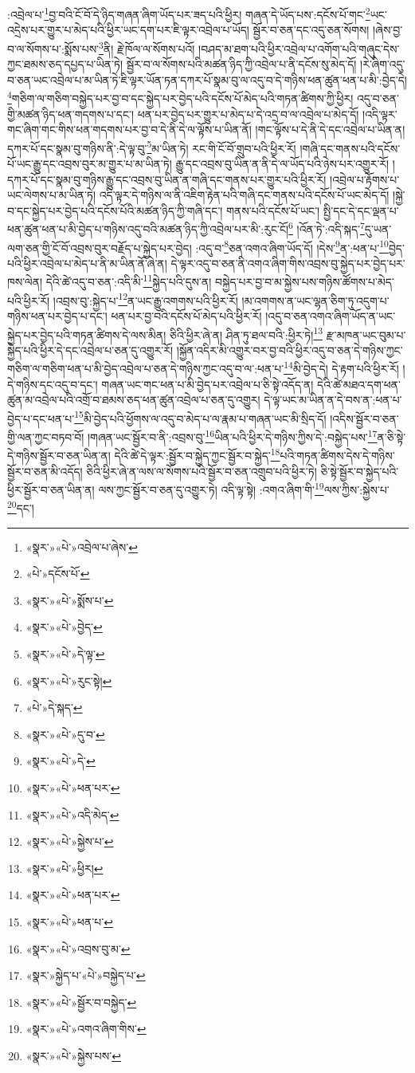 :འབྲེལ་པ་\footnote{«སྣར་»«པེ་»འབྲེལ་པ་ཞེས་}བྱ་བའི་ངོ་བོ་དེ་ཉིད་གཞན་ཞིག་ཡོད་པར་ཟད་པའི་ཕྱིར། གཞན་དེ་ཡོད་པས་:དངོས་པོ་གང་\footnote{«པེ་»དངོས་པོ་}ཡང་འདྲེས་པར་གྱུར་པ་མེད་པའི་ཕྱིར་ཡང་དག་པར་ཇི་ལྟར་འབྲེལ་པ་ཡོད། སྦྱོར་བ་ཅན་དང་འདུ་ཅན་སོགས། །ཞེས་བྱ་བ་ལ་སོགས་པ་:སྨོས་པས་\footnote{«སྣར་»«པེ་»སྨོས་པ་}ནི། རྗེ་ཁོལ་ལ་སོགས་པའོ། །བཤད་མ་ཐག་པའི་ཕྱིར་འབྲེལ་པ་འགོག་པའི་གཞུང་དེས་ཀྱང་ཐམས་ཅད་དཔྱད་པ་ཡིན་ཏེ། སྦྱོར་བ་ལ་སོགས་པའི་མཚན་ཉིད་ཀྱི་འབྲེལ་པ་ནི་དངོས་སུ་མེད་དོ། །རེ་ཞིག་འདུ་བ་ཅན་ཡང་འབྲེལ་པ་མ་ཡིན་ཏེ་ཇི་ལྟར་ཡོན་ཏན་དཀར་པོ་སྣམ་བུ་ལ་འདུ་བ་དེ་གཉིས་ཕན་ཚུན་ཕན་པ་མི་:བྱེད་དེ། \footnote{«སྣར་»«པེ་»བྱེད་}གཅིག་ལ་གཅིག་བསྐྱེད་པར་བྱ་བ་དང་སྐྱེད་པར་བྱེད་པའི་དངོས་པོ་མེད་པའི་གཏན་ཚིགས་ཀྱི་ཕྱིར། འདུ་བ་ཅན་གྱི་མཚན་ཉིད་ཕན་གདགས་པ་དང་། ཕན་པར་བྱེད་པར་གྱུར་པ་མེད་པ་དེ་འདྲ་བ་ལ་འབྲེལ་པ་མེད་དོ། །འདི་ལྟར་གང་ཞིག་གང་གིས་ཕན་གདགས་པར་བྱ་བ་དེ་ནི་དེ་ལ་ལྟོས་པ་ཡིན་ནོ། །གང་ལྟོས་པ་དེ་ནི་དེ་དང་འབྲེལ་པ་ཡིན་ན། དཀར་པོ་དང་སྣམ་བུ་གཉིས་ནི་:དེ་ལྟ་བུ་\footnote{«སྣར་»«པེ་»དེ་ལྟ་}མ་ཡིན་ཏེ། རང་གི་ངོ་བོ་གྲུབ་པའི་ཕྱིར་རོ། །གཞི་དང་གནས་པའི་དངོས་པོ་ཡང་རྒྱུ་དང་འབྲས་བུར་མ་གྱུར་པ་མ་ཡིན་ཏེ། རྒྱུ་དང་འབྲས་བུ་ཡིན་ན་ནི་དེ་ལ་ཡོད་པའི་ཉེས་པར་འགྱུར་རོ། །དཀར་པོ་དང་སྣམ་བུ་གཉིས་རྒྱུ་དང་འབྲས་བུ་ཡིན་ན་གཞི་དང་གནས་པར་གྱུར་པའི་ཕྱིར་རོ། །འབྲེལ་པ་རྟོགས་པ་ཡང་ལེགས་པ་མ་ཡིན་ཏེ། འདི་ལྟར་དེ་གཉིས་ལ་ནི་འཇིག་རྟེན་པའི་གཞི་དང་གནས་པའི་དངོས་པོ་ཡང་མེད་དོ། །སྐྱེ་བ་དང་སྐྱེད་པར་བྱེད་པའི་དངོས་པོའི་མཚན་ཉིད་ཀྱི་གཞི་དང་། གནས་པའི་དངོས་པོ་ཡང་། སྤྱི་དང་དེ་དང་ལྡན་པ་ཕན་ཚུན་ཕན་པ་མི་བྱེད་པ་གཉིས་འདུ་བའི་མཚན་ཉིད་ཀྱི་འབྲེལ་པར་མི་:རུང་ངོ།\footnote{«སྣར་»«པེ་»རུང་སྟེ།} །འོན་ཏེ་:འདི་སྐད་\footnote{«པེ་»དེ་སྐད་}དུ་ཡན་ལག་ཅན་གྱི་ངོ་བོ་འབྲས་བུར་བརྗོད་པ་སྐྱེད་པར་བྱེད། :འདུ་བ་\footnote{«སྣར་»«པེ་»དུ་བ་}ཅན་འགའ་ཞིག་ཡོད་དོ། །དེས་\footnote{«སྣར་»«པེ་»དེ་}ན་:ཕན་པ་\footnote{«སྣར་»«པེ་»ཕན་པར་}བྱེད་པའི་ཕྱིར་འབྲེལ་པ་མེད་པ་ནི་མ་ཡིན་ནོ་ཞེ་ན། དེ་ལྟར་འདུ་བ་ཅན་ནི་འགའ་ཞིག་གིས་འབྲས་བུ་སྐྱེད་པར་བྱེད་པར་ཁས་ལེན། དེའི་ཚེ་འདུ་བ་ཅན་:འདི་མི་\footnote{«སྣར་»«པེ་»འདི་མེད་}སྐྱེད་པའི་དུས་ན། བསྐྱེད་པར་བྱ་བ་མ་སྐྱེས་པས་གཉིས་ཚོགས་པ་མེད་པའི་ཕྱིར་རོ། །འབྲས་བུ་:སྐྱེད་པ་\footnote{«སྣར་»«པེ་»སྐྱེས་པ་}ན་ཡང་རྒྱུ་འགགས་པའི་ཕྱིར་རོ། །མ་འགགས་ན་ཡང་ལྷན་ཅིག་ཏུ་འདུག་པ་གཉིས་ཕན་པར་བྱེད་པ་དང་། ཕན་པར་བྱ་བའི་དངོས་པོ་མེད་པའི་ཕྱིར་རོ། །འདུ་བ་ཅན་འགའ་ཞིག་ཡོད་ན་ཡང་སྐྱེད་པར་བྱེད་པའི་གཏན་ཚིགས་དེ་ལས་མིན། ཅིའི་ཕྱིར་ཞེ་ན། ཤིན་ཏུ་ཐལ་བའི་:ཕྱིར་ཏེ།\footnote{«སྣར་»«པེ་»ཕྱིར།} རྫ་མཁན་ཡང་བུམ་པ་སྐྱེད་པའི་ཕྱིར་དེ་དང་འབྲེལ་པ་ཅན་དུ་འགྱུར་རོ། །སྐྱོན་འདིར་མི་འགྱུར་བར་བྱ་བའི་ཕྱིར་འདུ་བ་ཅན་དེ་གཉིས་ཀྱང་གཅིག་ལ་གཅིག་ཕན་པ་མི་བྱེད་འབྲེལ་པ་ཅན་དེ་གཉིས་ཀྱང་འདུ་བ་ལ་:ཕན་པ་\footnote{«སྣར་»«པེ་»ཕན་པར་}མི་བྱེད་དེ། དེ་རྟག་པའི་ཕྱིར་རོ། །དེ་གཉིས་དང་འདུ་བ་དང་། གཞན་ཡང་གང་ཕན་པ་མི་བྱེད་པར་འབྲེལ་པ་ཅི་སྟེ་འདོད་ན། དེའི་ཚེ་མཐའ་དག་ཕན་ཚུན་མ་འབྲེལ་པའི་འགྲོ་བ་ཐམས་ཅད་ཕན་ཚུན་འབྲེལ་པ་ཅན་དུ་འགྱུར། དེ་ལྟ་ཡང་མ་ཡིན་ན་དེ་བས་ན་:ཕན་པ་བྱེད་པ་དང་ཕན་པ་\footnote{«སྣར་»«པེ་»ཕན་པ་}མི་བྱེད་པའི་ཕྱོགས་ལ་འདུ་བ་མེད་པ་ལ་རྣམ་པ་གཞན་ཡང་མི་སྲིད་དོ། །འདིས་སྦྱོར་བ་ཅན་གྱི་ལན་ཀྱང་བཏབ་བོ། །གཞན་ཡང་སྦྱོར་བ་ནི་:འབྲས་བུ་\footnote{«སྣར་»«པེ་»འབྲས་བུ་མ་}ཡིན་པའི་ཕྱིར་དེ་གཉིས་ཀྱིས་དེ་:བསྐྱེད་པས་\footnote{«སྣར་»སྐྱེད་པ་«པེ་»བསྐྱེད་པ་}ན་ཅི་སྟེ་དེ་གཉིས་སྦྱོར་བ་ཅན་ཡིན་ན། དེའི་ཚེ་དེ་ལྟར་:སྦྱོར་བ་སྐྱེད་ཀྱང་སྦྱོར་བ་སྐྱེད་\footnote{«སྣར་»«པེ་»སྦྱོར་བ་བསྐྱེད་}པའི་གཏན་ཚིགས་དེས་དེ་གཉིས་སྦྱོར་བ་ཅན་མི་འདོད། ཅིའི་ཕྱིར་ཞེ་ན་ལས་ལ་སོགས་པའི་སྦྱོར་བ་ཅན་འགྲུབ་པའི་ཕྱིར་ཏེ། ཅི་སྟེ་སྦྱོར་བ་སྐྱེད་པའི་ཕྱིར་སྦྱོར་བ་ཅན་ཡིན་ན། ལས་ཀྱང་སྦྱོར་བ་ཅན་དུ་འགྱུར་ཏེ། འདི་ལྟ་སྟེ། :འགའ་ཞིག་གི་\footnote{«སྣར་»«པེ་»འགའ་ཞིག་གིས་}ལས་ཀྱིས་:སྐྱེས་པ་\footnote{«སྣར་»«པེ་»སྐྱེས་པས་}དང་། 
